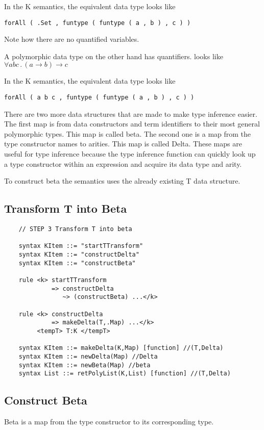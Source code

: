 In the K semantics, the equivalent data type looks like
\begin{lstlisting}
forAll ( .Set , funtype ( funtype ( a , b ) , c ) )
\end{lstlisting}

Note how there are no quantified variables.

A polymorphic data type on the other hand has quantifiers. looks like $\forall a b c \, . \, (a \rightarrow b) \rightarrow c$

In the K semantics, the equivalent data type looks like
\begin{lstlisting}
forAll ( a b c , funtype ( funtype ( a , b ) , c ) )
\end{lstlisting}

There are two more data structures that are made to make type inference easier. The first map is from data constructors and term identifiers to their most general polymorphic types. This map is called beta. The second one is a map from the type constructor names to arities. This map is called Delta. These maps are useful for type inference because the type inference function can quickly look up a type constructor within an expression and acquire its data type and arity.

To construct beta the semantics uses the already existing T data structure.

\subsection{Transform T into Beta}
\begin{lstlisting}
    // STEP 3 Transform T into beta

    syntax KItem ::= "startTTransform"
    syntax KItem ::= "constructDelta"
    syntax KItem ::= "constructBeta"

    rule <k> startTTransform
             => constructDelta
                ~> (constructBeta) ...</k>

    rule <k> constructDelta
             => makeDelta(T,.Map) ...</k>
         <tempT> T:K </tempT>

    syntax KItem ::= makeDelta(K,Map) [function] //(T,Delta)
    syntax KItem ::= newDelta(Map) //Delta
    syntax KItem ::= newBeta(Map) //beta
    syntax List ::= retPolyList(K,List) [function] //(T,Delta)
\end{lstlisting}

\subsection{Construct Beta}
Beta is a map from the type constructor to its corresponding type.


